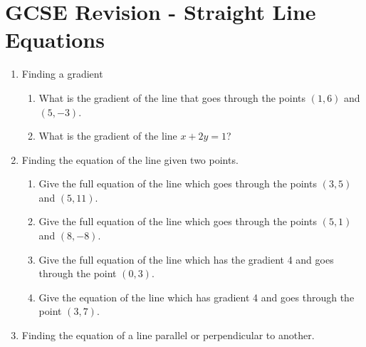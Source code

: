 \chapter{GCSE Revision - Straight Line Equations}

\begin{enumerate}
  \item Finding a gradient
  \begin{enumerate}
    \item What is the gradient of the line that goes through the points $(1,6)$ and $(5,-3)$.\strch
    \item What is the gradient of the line $x + 2y = 1$?\strch
  \end{enumerate}
  \item Finding the equation of the line given two points.
  \begin{enumerate}
    \item Give the full equation of the line which goes through the points $(3,5)$ and $(5,11)$.\strch
    \item Give the full equation of the line which goes through the points $(5,1)$ and $(8,-8)$.\strch
    \item Give the full equation of the line which has the gradient 4 and goes through the point $(0,3)$.\strch
    \item Give the equation of the line which has gradient 4 and goes through the point $(3,7)$.\strch
  \end{enumerate}
  \newpage
  \item Finding the equation of a line parallel or perpendicular to another.
\end{enumerate}

